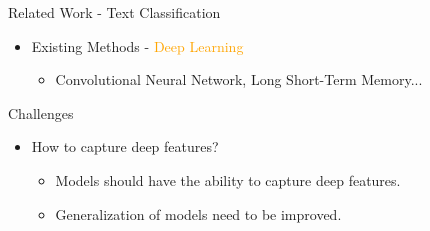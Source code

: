 \documentclass[
 size=14pt,
 paper=smartboard,  %
 mode=present, 		%
 display=slides, 	%
 style=tuliplab,  	%
 pauseslide,
 fleqn,leqno]{powerdot}
\begin{document}
\begin{slide}[toc=,bm=]{Related Work - Text Classification}
	
	\begin{itemize}
		\item
		Existing Methods - \textcolor{orange} {Deep Learning}
		
		\begin{itemize}
			\item
			Convolutional Neural Network, Long Short-Term Memory...
			
		\end{itemize}
		\bigskip
	\end{itemize}
	
\end{slide}


\begin{slide}{Challenges}
\begin{itemize}
\item
How to capture deep features?

\begin{itemize}
\item
Models should have the ability to capture deep features.

\item
Generalization of models need to be improved.
\end{itemize}
\end{itemize}


\end{slide}
\end{document}
